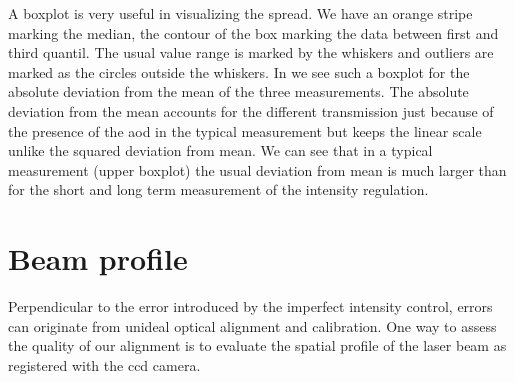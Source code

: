 A boxplot is very useful in visualizing the spread. We have an orange stripe
marking the median, the contour of the box marking the data between first and
third quantil. The usual value range is marked by the whiskers and outliers
are marked as the circles outside the whiskers.
In  we see such a boxplot for the
absolute deviation from the mean of the three measurements. The absolute
deviation from the mean accounts for the different transmission just because
of the presence of the \gls{aod} in the typical measurement but keeps the
linear scale unlike the squared deviation from mean. We can see that in a
typical measurement (upper boxplot) the usual deviation from mean is much
larger than for the short and long term measurement of the intensity
regulation.

\section{Beam profile}

Perpendicular to the error introduced by the imperfect intensity control,
errors can originate from unideal optical alignment and calibration. One way
to assess the quality of our alignment is to evaluate the spatial profile of
the laser beam as registered with the \gls{ccd} camera.

